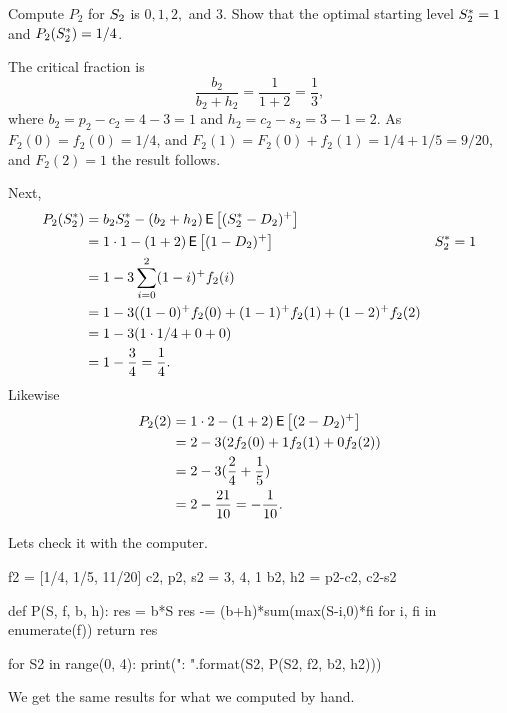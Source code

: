 \begin{exercise}
Compute $P_2$ for $S_2$ is $0, 1, 2,$ and $3$. Show that the optimal starting level $S^*_2 = 1$ and $P_2(S_2^*) = 1/4$.
\begin{solution}
The critical fraction is 
\begin{equation*}
\frac{b_2}{b_2+h_2} = \frac{1}{1+2} = \frac 1 3,
\end{equation*}
where $b_2 =p_2-c_2 = 4-3=1$ and $h_2 =c_2 - s_2 = 3-1=2$. 
As $F_2(0)=f_2(0)=1/4$, and $F_2(1)=F_2(0) + f_2(1) = 1/4 + 1/5 = 9/20$, and $F_2(2)=1$ the result follows.

Next, 
\begin{align*}
  P_2(S_2^*) 
&= b_2 S_2^* - (b_2+h_2)\,\mathsf{E}\left[(S_2^*-D_2)^+\right] \\
&= 1\cdot 1 - (1+2)\,\mathsf{E}\left[(1-D_2)^+\right] & S_2^* = 1\\
&=1 - 3 \sum_{i=0}^2 (1-i)^+ f_2(i) \\
&=1 - 3 ((1-0)^+ f_2(0) + (1-1)^+ f_2(1) +(1-2)^+ f_2(2) \\
&=1 - 3 (1\cdot 1/4 + 0 + 0 ) \\
&=  1 - \frac 3 4 = \frac 1 4.
\end{align*}
Likewise 
\begin{align*}
  P_2(2) 
&= 1\cdot 2 - (1+2)\,\mathsf{E}\left[(2-D_2)^+\right] \\
&= 2 - 3 (2f_2(0) + 1 f_2(1) + 0 f_2(2))\\
&= 2 - 3 (\frac{2}{4} + \frac 1 5)\\
&= 2 - \frac{21}{10} = -\frac 1{10}.
\end{align*}

Lets check it with the computer.
\begin{pyconsole}
f2 = [1/4, 1/5, 11/20]
c2, p2, s2 = 3, 4, 1
b2, h2 = p2-c2, c2-s2

def P(S, f, b, h):
    res = b*S
    res -= (b+h)*sum(max(S-i,0)*fi for i, fi in enumerate(f))
    return res
    
for S2 in range(0, 4):
    print("{}: {}".format(S2, P(S2, f2, b2, h2)))

\end{pyconsole}
We get the same results for what we computed by hand.

\end{solution}
\end{exercise}

